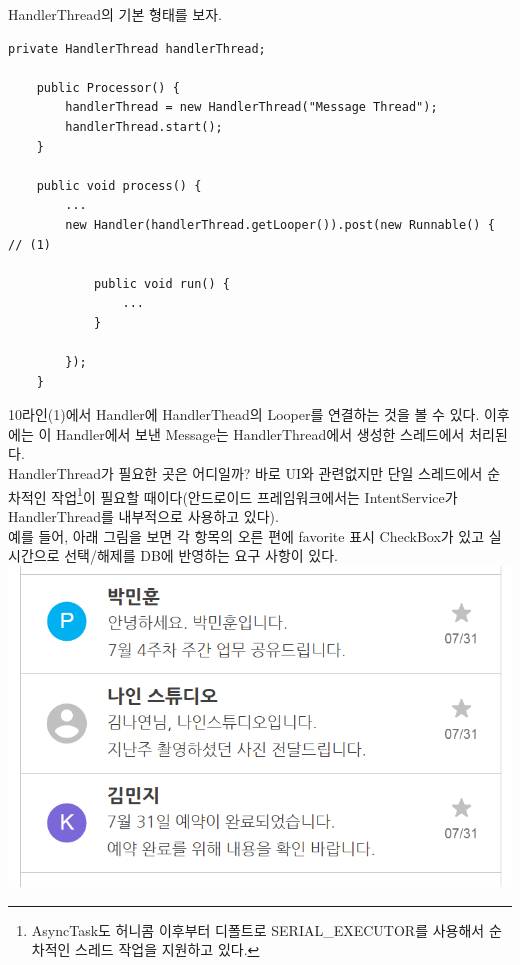 HandlerThread의 기본 형태를 보자.
\begin{lstlisting}[frame=single] 
	private HandlerThread handlerThread;
	
	public Processor() {
		handlerThread = new HandlerThread("Message Thread");
		handlerThread.start();
	}
	
	public void process() {
		...
		new Handler(handlerThread.getLooper()).post(new Runnable() {  // (1)
		
			public void run() {
				...
			}
			
		});
	}
\end{lstlisting}
10라인(1)에서 Handler에 HandlerThead의 Looper를 연결하는 것을 볼 수 있다. 이후에는 이 Handler에서 보낸 Message는 HandlerThread에서 생성한 스레드에서 처리된다.\\

HandlerThread가 필요한 곳은 어디일까? 
바로 UI와 관련없지만 단일 스레드에서 순차적인 작업\footnote{AsyncTask도  허니콤 이후부터 디폴트로 SERIAL\_EXECUTOR를 사용해서 순차적인 스레드 작업을 지원하고 있다.}이 필요할 때이다(안드로이드 프레임워크에서는 IntentService가 HandlerThread를 내부적으로 사용하고 있다).\\

예를 들어, 아래 그림을 보면 각 항목의 오른 편에 favorite 표시 CheckBox가 있고
실시간으로 선택/해제를 DB에 반영하는 요구 사항이 있다.\\
\includegraphics[scale=0.65]{favorite_sample}

